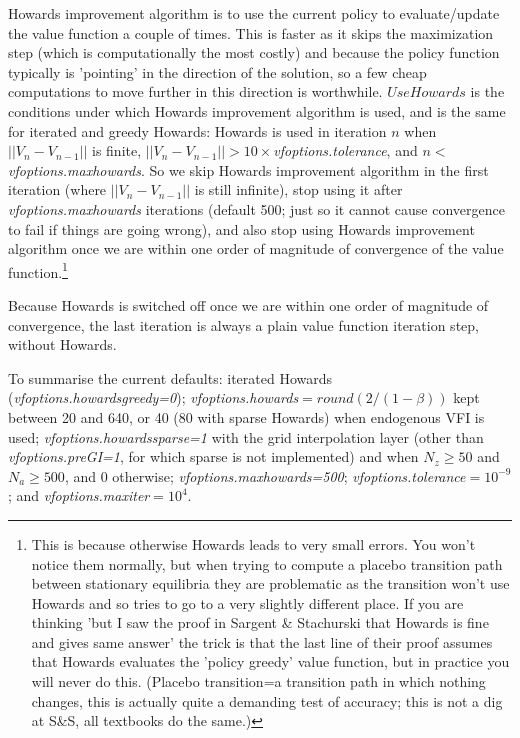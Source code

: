 Howards improvement algorithm is to use the current policy to evaluate/update the value function a couple of times. This is faster as it skips the maximization step (which is computationally the most costly) and because the policy function typically is 'pointing' in the direction of the solution, so a few cheap computations to move further in this direction is worthwhile. $UseHowards$ is the conditions under which Howards improvement algorithm is used, and is the same for iterated and greedy Howards: Howards is used in iteration $n$ when $||V_n-V_{n-1}||$ is finite, $||V_n-V_{n-1}||>10\times$\textit{vfoptions.tolerance}, and $n<$\textit{vfoptions.maxhowards}. So we skip Howards improvement algorithm in the first iteration (where $||V_n-V_{n-1}||$ is still infinite), stop using it after \textit{vfoptions.maxhowards} iterations (default 500; just so it cannot cause convergence to fail if things are going wrong), and also stop using Howards improvement algorithm once we are within one order of magnitude of convergence of the value function.\footnote{This is because otherwise Howards leads to very small errors. You won't notice them normally, but when trying to compute a placebo transition path between stationary equilibria they are problematic as the transition won't use Howards and so tries to go to a very slightly different place. If you are thinking 'but I saw the proof in Sargent \& Stachurski that Howards is fine and gives same answer' the trick is that the last line of their proof assumes that Howards evaluates the 'policy greedy' value function, but in practice you will never do this. (Placebo transition=a transition path in which nothing changes, this is actually quite a demanding test of accuracy; this is not a dig at S\&S, all textbooks do the same.)}

Because Howards is switched off once we are within one order of magnitude of convergence, the last iteration is always a plain value function iteration step, without Howards.

To summarise the current defaults: iterated Howards (\textit{vfoptions.howardsgreedy=0}); \textit{vfoptions.howards}$=round(2/(1-\beta))$ kept between 20 and 640, or 40 (80 with sparse Howards) when endogenous VFI is used; \textit{vfoptions.howardssparse=1} with the grid interpolation layer (other than \textit{vfoptions.preGI=1}, for which sparse is not implemented) and when $N_z\geq 50$ and $N_a\geq 500$, and 0 otherwise; \textit{vfoptions.maxhowards=500}; \textit{vfoptions.tolerance}$=10^{-9}$; and \textit{vfoptions.maxiter}$=10^4$.

